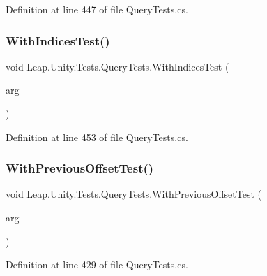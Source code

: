 Definition at line 447 of file Query\+Tests.\+cs.

\mbox{\label{class_leap_1_1_unity_1_1_tests_1_1_query_tests_a786f6275e4a09958d102bdf47bcf5cd7}} 
\subsubsection{\texorpdfstring{WithIndicesTest()}{WithIndicesTest()}}
{\footnotesize\ttfamily void Leap.\+Unity.\+Tests.\+Query\+Tests.\+With\+Indices\+Test (\begin{DoxyParamCaption}\item[{\mbox{[}\+Value\+Source(\char`\"{}list0\char`\"{})\mbox{]} \mbox{\hyperlink{class_leap_1_1_unity_1_1_tests_1_1_query_tests_1_1_query_arg}{Query\+Arg}}}]{arg }\end{DoxyParamCaption})}



Definition at line 453 of file Query\+Tests.\+cs.

\mbox{\label{class_leap_1_1_unity_1_1_tests_1_1_query_tests_a88b251c46c9a85ea40c3eb67d50c70e5}} 
\subsubsection{\texorpdfstring{WithPreviousOffsetTest()}{WithPreviousOffsetTest()}}
{\footnotesize\ttfamily void Leap.\+Unity.\+Tests.\+Query\+Tests.\+With\+Previous\+Offset\+Test (\begin{DoxyParamCaption}\item[{\mbox{[}\+Value\+Source(\char`\"{}list0\char`\"{})\mbox{]} \mbox{\hyperlink{class_leap_1_1_unity_1_1_tests_1_1_query_tests_1_1_query_arg}{Query\+Arg}}}]{arg }\end{DoxyParamCaption})}



Definition at line 429 of file Query\+Tests.\+cs.

\mbox{\label{class_leap_1_1_unity_1_1_tests_1_1_query_tests_a6dbf45b48855e817e5ed3c71d522507a}} 
